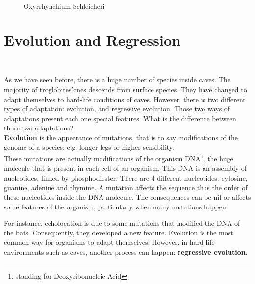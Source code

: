 \documentclass[draft, final]{report}
\begin{document}
\begin{figure}[!ht]
\begin{minipage}[c]{.46\linewidth}
        \caption{Oxyrrhynchium Schleicheri\cite{oxyrrhynchiumschleicheri}}
    \end{minipage}
  \end{figure}
\clearpage
\section{Evolution and Regression}
~\par
As we have seen before, there is a huge number of species inside caves. The majority of troglobites’ones descends from surface species. They have changed to adapt themselves to hard-life conditions of caves. However, there is two different types of adaptation: evolution, and regressive evolution. Those two ways of adaptations present each one special features.
What is the difference between those two adaptations?\\

\textbf{Evolution} is the appearance of mutations, that is to say modifications of the genome
of a species: e.g. longer legs or higher sensibility. \\
These mutations are actually modifications of the organism DNA\footnote{standing for Deoxyribonucleic Acid}, the huge molecule that is present in each cell of an organism. This DNA is an assembly of nucleotides, linked by phosphodiester. There are 4 different nucleotides: cytosine, guanine, adenine and thymine. A mutation affects the sequence thus the order of these nucleotides inside the DNA molecule. The consequences can be nil or affects some features of the organism, particularly when many mutations happen.

For instance, echolocation is due to some mutations that modified the DNA of the bats. Consequently, they developed a new feature.
Evolution is the most common way for organisms to adapt themselves. However, in hard-life environments such as caves, another process can happen: \textbf{regressive evolution}.
\end{document}
